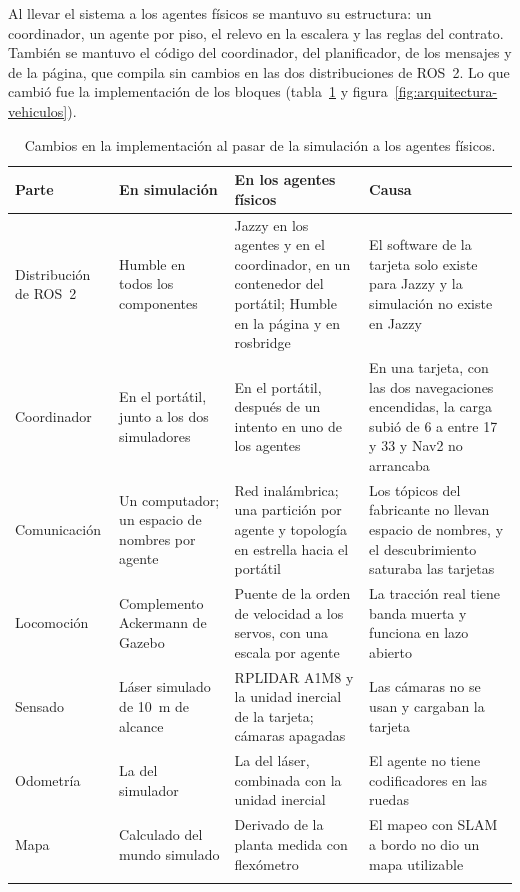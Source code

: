 Al llevar el sistema a los agentes físicos se mantuvo su estructura: un coordinador, un agente por piso, el relevo en la escalera y las reglas del contrato. También se mantuvo el código del coordinador, del planificador, de los mensajes y de la página, que compila sin cambios en las dos distribuciones de ROS~2. Lo que cambió fue la implementación de los bloques (tabla~\ref{tab:sim-vehiculos} y figura~\ref{fig:arquitectura-vehiculos}).

\begin{table}[H]
  \centering\footnotesize{}
  \caption{Cambios en la implementación al pasar de la simulación a los agentes físicos.}
  \label{tab:sim-vehiculos}
  \begin{tabular}{@{}p{}p{}p{}p{}@{}}
    \toprule
    \textbf{Parte} & \textbf{En simulación} & \textbf{En los agentes físicos} & \textbf{Causa} \\ \midrule
    Distribución de ROS~2 & Humble en todos los componentes & Jazzy en los agentes y en el coordinador, en un contenedor del portátil; Humble en la página y en rosbridge & El software de la tarjeta solo existe para Jazzy y la simulación no existe en Jazzy \\ \addlinespace
    Coordinador & En el portátil, junto a los dos simuladores & En el portátil, después de un intento en uno de los agentes & En una tarjeta, con las dos navegaciones encendidas, la carga subió de 6 a entre 17 y 33 y Nav2 no arrancaba \\ \addlinespace
    Comunicación & Un computador; un espacio de nombres por agente & Red inalámbrica; una partición por agente y topología en estrella hacia el portátil & Los tópicos del fabricante no llevan espacio de nombres, y el descubrimiento saturaba las tarjetas \\ \addlinespace
    Locomoción & Complemento Ackermann de Gazebo & Puente de la orden de velocidad a los servos, con una escala por agente & La tracción real tiene banda muerta y funciona en lazo abierto \\ \addlinespace
    Sensado & Láser simulado de 10~m de alcance & RPLIDAR A1M8 y la unidad inercial de la tarjeta; cámaras apagadas & Las cámaras no se usan y cargaban la tarjeta \\ \addlinespace
    Odometría & La del simulador & La del láser, combinada con la unidad inercial & El agente no tiene codificadores en las ruedas \\ \addlinespace
    Mapa & Calculado del mundo simulado & Derivado de la planta medida con flexómetro & El mapeo con SLAM a bordo no dio un mapa utilizable \\ \addlinespace

\end{tabular}
\end{table}
